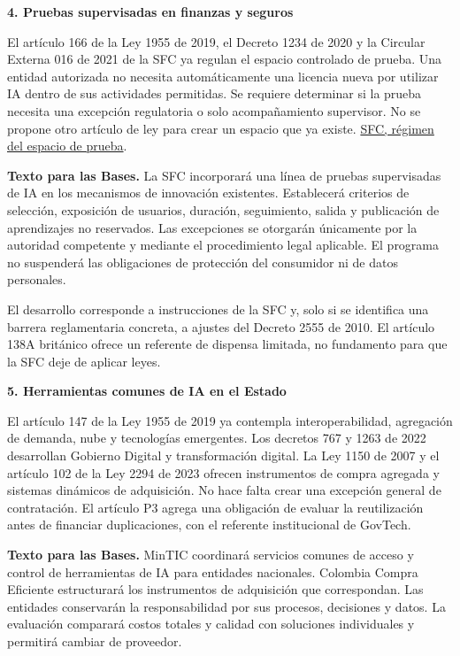 \textbf{4. Pruebas supervisadas en finanzas y seguros}\par\nobreak

El artículo 166 de la Ley 1955 de 2019, el Decreto 1234 de 2020 y la Circular Externa 016 de 2021 de la SFC ya regulan el espacio controlado de prueba. Una entidad autorizada no necesita automáticamente una licencia nueva por utilizar IA dentro de sus actividades permitidas. Se requiere determinar si la prueba necesita una excepción regulatoria o solo acompañamiento supervisor. No se propone otro artículo de ley para crear un espacio que ya existe. \href{https://www.superfinanciera.gov.co/preguntas-frecuentes/35/35-espacio-controlado-de-prueba-innovasfc/}{SFC, régimen del espacio de prueba}.

\textbf{Texto para las Bases.} La SFC incorporará una línea de pruebas supervisadas de IA en los mecanismos de innovación existentes. Establecerá criterios de selección, exposición de usuarios, duración, seguimiento, salida y publicación de aprendizajes no reservados. Las excepciones se otorgarán únicamente por la autoridad competente y mediante el procedimiento legal aplicable. El programa no suspenderá las obligaciones de protección del consumidor ni de datos personales.

El desarrollo corresponde a instrucciones de la SFC y, solo si se identifica una barrera reglamentaria concreta, a ajustes del Decreto 2555 de 2010. El artículo 138A británico ofrece un referente de dispensa limitada, no fundamento para que la SFC deje de aplicar leyes.

\textbf{5. Herramientas comunes de IA en el Estado}\par\nobreak

El artículo 147 de la Ley 1955 de 2019 ya contempla interoperabilidad, agregación de demanda, nube y tecnologías emergentes. Los decretos 767 y 1263 de 2022 desarrollan Gobierno Digital y transformación digital. La Ley 1150 de 2007 y el artículo 102 de la Ley 2294 de 2023 ofrecen instrumentos de compra agregada y sistemas dinámicos de adquisición. No hace falta crear una excepción general de contratación. El artículo P3 agrega una obligación de evaluar la reutilización antes de financiar duplicaciones, con el referente institucional de GovTech.

\textbf{Texto para las Bases.} MinTIC coordinará servicios comunes de acceso y control de herramientas de IA para entidades nacionales. Colombia Compra Eficiente estructurará los instrumentos de adquisición que correspondan. Las entidades conservarán la responsabilidad por sus procesos, decisiones y datos. La evaluación comparará costos totales y calidad con soluciones individuales y permitirá cambiar de proveedor.

